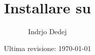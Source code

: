 


\title{Installare \texlive{} su \gnulinux{}}
\author{Indrjo Dedej}
\date{Ultima revisione: \today}


\maketitle



\printbibliography
%
